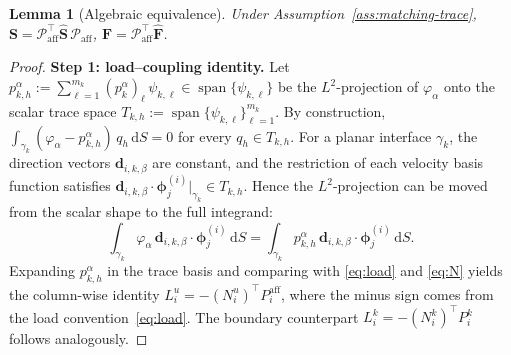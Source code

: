 \documentclass[11pt,a4paper]{article}
\newtheorem{lemma}[assumption]{Lemma}
\newcommand{\iface}{\gamma}
\newcommand{\Schur}{\mathbf{S}}
\begin{document}
\begin{lemma}[Algebraic equivalence]\label{lem:equivalence}
  Under Assumption~\ref{ass:matching-trace},
  $\Schur = \mathcal{P}_{\text{aff}}^\top \widehat{\Schur}\,
           \mathcal{P}_{\text{aff}}$,
  $\bm{F} = \mathcal{P}_{\text{aff}}^\top \widehat{\bm{F}}$.
\end{lemma}

\begin{proof}
  \textbf{Step 1: load--coupling identity.}
  Let $p_{k,h}^\alpha := \sum_{\ell=1}^{m_k} (p_k^\alpha)_\ell\,
  \psi_{k,\ell} \in \operatorname{span}\{\psi_{k,\ell}\}$ be the
  $L^2$-projection of $\varphi_\alpha$ onto the scalar trace space
  $T_{k,h} := \operatorname{span}\{\psi_{k,\ell}\}_{\ell=1}^{m_k}$.
  By construction,
  $\int_{\iface_k} (\varphi_\alpha - p_{k,h}^\alpha)\, q_h\,\mathrm{d}S
   = 0$ for every $q_h \in T_{k,h}$.
  For a planar interface $\iface_k$, the direction vectors
  $\bm{d}_{i,k,\beta}$ are constant, and the restriction of each
  velocity basis function satisfies
  $\bm{d}_{i,k,\beta}\!\cdot\!\bm{\phi}_j^{(i)}|_{\iface_k}
   \in T_{k,h}$.
  Hence the $L^2$-projection can be moved from the scalar shape to
  the full integrand:
  \[
    \int_{\iface_k} \varphi_\alpha\,
      \bm{d}_{i,k,\beta}\!\cdot\!\bm{\phi}_j^{(i)}\,\mathrm{d}S
    = \int_{\iface_k} p_{k,h}^\alpha\,
      \bm{d}_{i,k,\beta}\!\cdot\!\bm{\phi}_j^{(i)}\,\mathrm{d}S.
  \]
  Expanding $p_{k,h}^\alpha$ in the trace basis and comparing with
  \eqref{eq:load} and \eqref{eq:N} yields the column-wise identity
  $L_i^u = -(N_i^u)^\top P_i^{\text{aff}}$, where the minus sign
  comes from the load convention~\eqref{eq:load}.  The boundary
  counterpart $L_i^k = -(N_i^k)^\top P_i^k$ follows analogously.


\end{proof}
\end{document}

